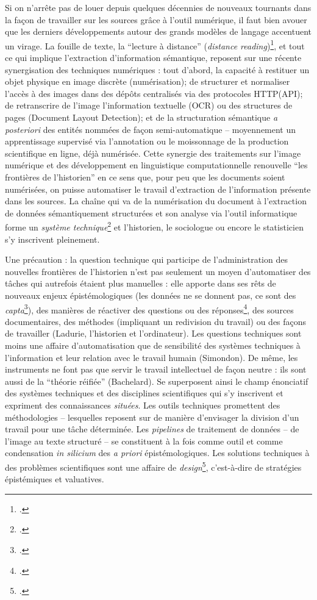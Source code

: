 Si on n'arrête pas de louer depuis quelques décennies de nouveaux tournants dans la façon de travailler sur les sources grâce à l'outil numérique, il faut bien avouer que les derniers développements autour des grands modèles de langage accentuent un virage. La fouille de texte, la \enquote{lecture à distance} (\textit{distance reading})\footcite{distant}, et tout ce qui implique l'extraction d'information sémantique, reposent sur une récente synergisation des techniques numériques : tout d'abord, la capacité à restituer un objet physique en image discrète (numérisation); de structurer et normaliser l'accès à des images dans des dépôts centralisés via des protocoles HTTP(API); de retranscrire de l'image l'information textuelle (OCR) ou des structures de pages (Document Layout Detection); et de la structuration sémantique \textit{a posteriori} des entités nommées de façon semi-automatique -- moyennement un apprentissage supervisé via l'annotation ou le moissonnage de la production scientifique en ligne, déjà numérisée. Cette synergie des traitements sur l'image numérique et des développement en linguistique computationnelle renouvelle \enquote{les frontières de l'historien} en ce sens que, pour peu que les documents soient numérisées, on puisse automatiser le travail d'extraction de l'information présente dans les sources. La chaîne qui va de la numérisation du document à l'extraction de données sémantiquement structurées et son analyse via l'outil informatique forme un \textit{système technique}\footcite{meot} et l'historien, le sociologue ou encore le statisticien s'y inscrivent pleinement. 

Une précaution : la question technique qui participe de l'administration des nouvelles frontières de l'historien n'est pas seulement un moyen d'automatiser des tâches qui autrefois étaient plus manuelles : elle apporte dans ses rêts de nouveaux enjeux épistémologiques (les données ne se donnent pas, ce sont des \textit{capta}\footcite{drucker}), des manières de réactiver des questions ou des réponses\footcite[][]{prost}, des sources documentaires, des méthodes (impliquant un redivision du travail) ou des façons de travailler (Ladurie, l'historien et l'ordinateur). Les questions techniques sont moins une affaire d'automatisation que de sensibilité des systèmes techniques à l'information et leur relation avec le travail humain (Simondon). De même, les instruments ne font pas que servir le travail intellectuel de façon neutre : ils sont aussi de la \enquote{théorie réifiée} (Bachelard). Se superposent ainsi le champ énonciatif des systèmes techniques et des disciplines scientifiques qui s'y inscrivent et expriment des connaissances \textit{situées}. Les outils techniques promettent des méthodologies -- lesquelles reposent sur de manière d'envisager la division d'un travail pour une tâche déterminée. Les \textit{pipelines} de traitement de données -- de l'image au texte structuré -- se constituent à la fois comme outil et comme condensation \textit{in silicium} des \textit{a priori} épistémologiques. Les solutions techniques à des problèmes scientifiques sont une affaire de \textit{design}\footcite{renon}, c'est-à-dire de stratégies épistémiques et valuatives.


